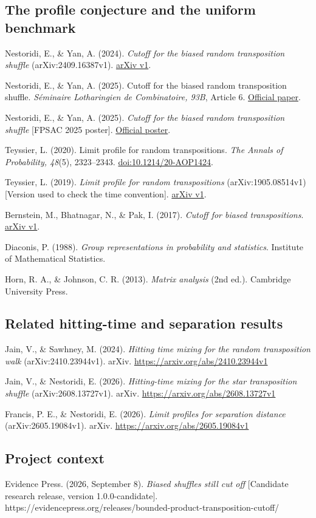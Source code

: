 \documentclass[
  british,
  11pt,
]{article}
\begin{document}
\subsection{The profile conjecture and the uniform
benchmark}\label{the-profile-conjecture-and-the-uniform-benchmark}

Nestoridi, E., \& Yan, A. (2024). \emph{Cutoff for the biased random
transposition shuffle} (arXiv:2409.16387v1).
\href{https://arxiv.org/abs/2409.16387v1}{arXiv v1}.

Nestoridi, E., \& Yan, A. (2025). Cutoff for the biased random
transposition shuffle. \emph{Séminaire Lotharingien de Combinatoire,
93B}, Article 6.
\href{https://www.mat.univie.ac.at/~slc/wpapers/FPSAC2025/6.pdf}{Official
paper}.

Nestoridi, E., \& Yan, A. (2025). \emph{Cutoff for the biased random
transposition shuffle} {[}FPSAC 2025 poster{]}.
\href{https://www.math.sci.hokudai.ac.jp/sympo/fpsac2025/public/posters/107.pdf}{Official
poster}.

Teyssier, L. (2020). Limit profile for random transpositions. \emph{The
Annals of Probability, 48}(5), 2323--2343.
\href{https://doi.org/10.1214/20-AOP1424}{doi:10.1214/20-AOP1424}.

Teyssier, L. (2019). \emph{Limit profile for random transpositions}
(arXiv:1905.08514v1) {[}Version used to check the time convention{]}.
\href{https://arxiv.org/abs/1905.08514v1}{arXiv v1}.

Bernstein, M., Bhatnagar, N., \& Pak, I. (2017). \emph{Cutoff for biased
transpositions}. \href{https://arxiv.org/abs/1709.03477v1}{arXiv v1}.

Diaconis, P. (1988). \emph{Group representations in probability and
statistics}. Institute of Mathematical Statistics.

Horn, R. A., \& Johnson, C. R. (2013). \emph{Matrix analysis} (2nd ed.).
Cambridge University Press.

\subsection{Related hitting-time and separation
results}\label{related-hitting-time-and-separation-results}

Jain, V., \& Sawhney, M. (2024). \emph{Hitting time mixing for the
random transposition walk} (arXiv:2410.23944v1). arXiv.
\url{https://arxiv.org/abs/2410.23944v1}

Jain, V., \& Nestoridi, E. (2026). \emph{Hitting-time mixing for the
star transposition shuffle} (arXiv:2608.13727v1). arXiv.
\url{https://arxiv.org/abs/2608.13727v1}

Francis, P. E., \& Nestoridi, E. (2026). \emph{Limit profiles for
separation distance} (arXiv:2605.19084v1). arXiv.
\url{https://arxiv.org/abs/2605.19084v1}

\subsection{Project context}\label{project-context}

Evidence Press. (2026, September 8). \emph{Biased shuffles still cut
off} {[}Candidate research release, version 1.0.0-candidate{]}.
https://evidencepress.org/releases/bounded-product-transposition-cutoff/
\end{document}
